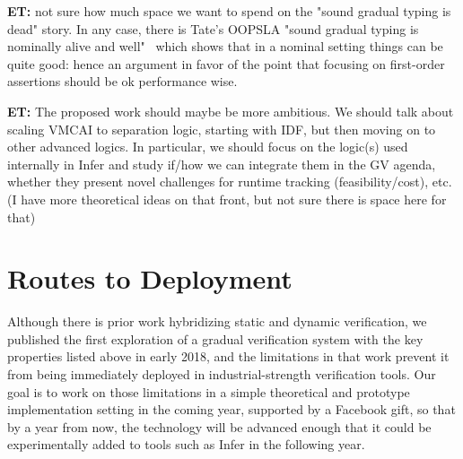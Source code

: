 \documentclass[10pt,twocolumn]{article}
\newcommand{\et}[1]{{\color{blue} {\bf ET:} #1}}
\begin{document}
\begin{sloppypar}
\et{not sure how much space we want to spend on the "sound gradual typing is dead" story. In any case, there is Tate's OOPSLA "sound gradual typing is nominally alive and well"~\cite{muehlboeckTate:oopsla2017} which shows that in a nominal setting things can be quite good: hence an argument in favor of the point that focusing on first-order assertions should be ok performance wise.}

\et{The proposed work should maybe be more ambitious. We should talk about scaling VMCAI to separation logic, starting with IDF, but then moving on to other advanced logics. In particular, we should focus on the logic(s) used internally in Infer and study if/how we can integrate them in the GV agenda, whether they present novel challenges for runtime tracking (feasibility/cost), etc. (I have more theoretical ideas on that front, but not sure there is space here for that)}



\section{Routes to Deployment}

Although there is prior work hybridizing static and dynamic verification, we published the first exploration of a gradual verification system with the key properties listed above in early 2018, and the limitations in that work prevent it from being immediately deployed in industrial-strength verification tools.  Our goal is to work on those limitations in a simple theoretical and prototype implementation setting in the coming year, supported by a Facebook gift, so that by a year from now, the technology will be advanced enough that it could be experimentally added to tools such as Infer in the following year.


\end{sloppypar}
\end{document}
